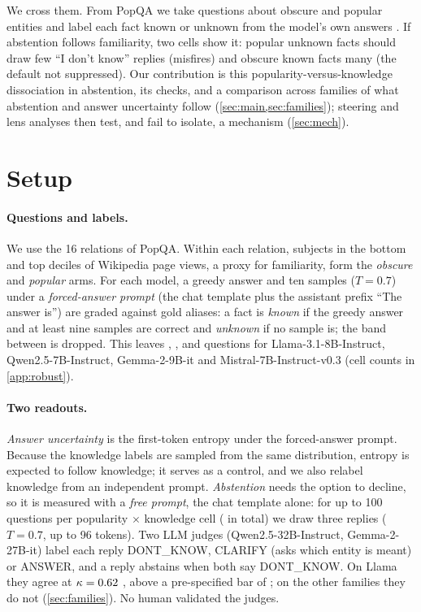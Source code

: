\documentclass{article}
\newcommand{\idk}{``I don't know''}
\begin{document}
We cross them. From PopQA \citep{mallen2023popqa} we take questions about obscure and popular entities and label each fact known or unknown from the model's own answers \citep{gekhman2024slick}. If abstention follows familiarity, two cells show it: popular unknown facts should draw few \idk{} replies (misfires) and obscure known facts many (the default not suppressed). Our contribution is this popularity-versus-knowledge dissociation in abstention, its checks, and a comparison across families of what abstention and answer uncertainty follow (\cref{sec:main,sec:families}); steering and lens analyses then test, and fail to isolate, a mechanism (\cref{sec:mech}).

\section{Setup}
\label{sec:setup}

\paragraph{Questions and labels.} We use the 16 relations of PopQA. Within each relation, subjects in the bottom and top deciles of Wikipedia page views, a proxy for familiarity, form the \emph{obscure} and \emph{popular} arms. For each model, a greedy answer and ten samples ($T=0.7$) under a \emph{forced-answer prompt} (the chat template plus the assistant prefix ``The answer is'') are graded against gold aliases: a fact is \emph{known} if the greedy answer and at least nine samples are correct and \emph{unknown} if no sample is; the band between is dropped. This leaves \faLlamaN, \faQwenN, \faGemmaN{} and \faMistralN{} questions for Llama-3.1-8B-Instruct, Qwen2.5-7B-Instruct, Gemma-2-9B-it and Mistral-7B-Instruct-v0.3 \citep{llama3,qwen25,gemma2,mistral7b} (cell counts in \cref{app:robust}).

\paragraph{Two readouts.} \emph{Answer uncertainty} is the first-token entropy under the forced-answer prompt. Because the knowledge labels are sampled from the same distribution, entropy is expected to follow knowledge; it serves as a control, and we also relabel knowledge from an independent prompt. \emph{Abstention} needs the option to decline, so it is measured with a \emph{free prompt}, the chat template alone: for up to 100 questions per popularity $\times$ knowledge cell (\hmLlamaItems{} in total) we draw three replies ($T=0.7$, up to 96 tokens). Two LLM judges (Qwen2.5-32B-Instruct, Gemma-2-27B-it) label each reply DONT\_KNOW, CLARIFY (asks which entity is meant) or ANSWER, and a reply abstains when both say DONT\_KNOW. On Llama they agree at $\kappa=0.62$ \lkKappaCI, above a pre-specified bar of \kappaBar; on the other families they do not (\cref{sec:families}). No human validated the judges.
\end{document}
